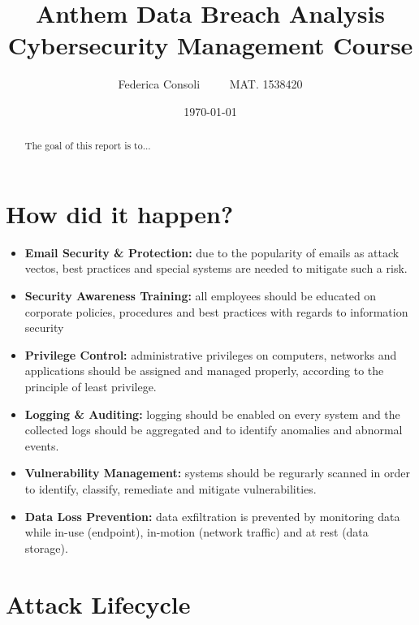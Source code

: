 \documentclass[a4paper]{article}
\title{%
	Anthem Data Breach Analysis\\
	\large Cybersecurity Management Course}
\author{Federica Consoli $\; \; \; \; \; \; \;$ MAT. 1538420}
\date{\today}
\begin{document}
	\maketitle
	\newpage
	\begin{abstract}
		The goal of this report is to...
	\end{abstract}

	\section{How did it happen?}
	
	\begin{itemize}
		\item \textbf{Email Security \& Protection:} due to the popularity of emails as attack vectos, best practices and special systems are needed to mitigate such a risk.
		\item \textbf{Security Awareness Training:} all employees should be educated on corporate policies, procedures and best practices with regards to information security
		\item \textbf{Privilege Control:} administrative privileges on computers, networks and applications should be assigned and managed properly, according to the principle of least privilege.
		\item \textbf{Logging \& Auditing:} logging should be enabled on every system and the collected logs should be aggregated and to identify anomalies and abnormal events.
		\item \textbf{Vulnerability Management:} systems should be regurarly scanned in order to identify, classify, remediate and mitigate vulnerabilities.
		\item \textbf{Data Loss Prevention:} data exfiltration is prevented by monitoring data while in-use (endpoint), in-motion (network traffic) and at rest (data storage).
		
	\end{itemize}
	\section{Attack Lifecycle}
\end{document}
